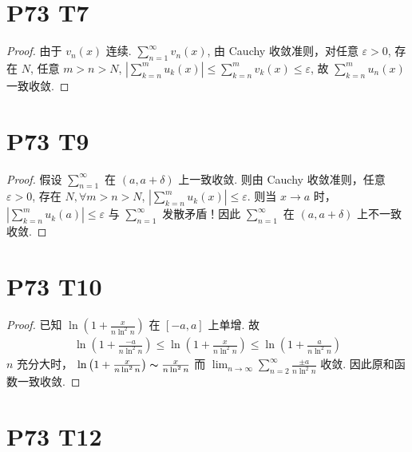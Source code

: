 \documentclass{article}
\begin{document}
\section*{P73 T7}

\begin{proof}
    由于 $v_n(x)$ 连续. $\sum_{n = 1}^{\infty}v_n(x)$, 由 Cauchy 收敛准则，对任意 $\varepsilon > 0$, 存在 $N$, 任意 $m > n > N$, $\left\lvert \sum_{k = n}^{m}u_k(x)\right\rvert \leq \sum_{k = n}^{m}v_k(x) \leq \varepsilon$, 故 $\sum_{k = n}^{m}u_n(x)$ 一致收敛.
\end{proof}

\section*{P73 T9}

\begin{proof}
    假设 $\sum_{n = 1}^{\infty}$ 在 $(a, a + \delta)$ 上一致收敛. 则由 Cauchy 收敛准则，任意 $\varepsilon > 0$, 存在 $N, \forall m > n > N$, $\left\lvert \sum_{k = n}^{m}u_k(x)\right\rvert \leq \varepsilon$. 则当 $x \to a$ 时， $\left\lvert \sum_{k = n}^{m}u_k(a)\right\rvert \leq \varepsilon$ 与 $\sum_{n = 1}^{\infty}$ 发散矛盾！因此 $\sum_{n = 1}^{\infty}$ 在 $(a, a + \delta)$ 上不一致收敛.
\end{proof}

\section*{P73 T10}

\begin{proof}
    已知 $\ln \left(1 + \frac{x}{n \ln^2 n}\right)$ 在 $[-a, a]$ 上单增. 故
    \begin{align*}
        \ln \left(1 + \frac{-a}{n \ln^2 n}\right) \leq \ln \left(1 + \frac{x}{n \ln^2 n}\right) \leq \ln \left(1 + \frac{a}{n \ln^2 n}\right)
    \end{align*}
    $n$ 充分大时， $\ln \left(1 + \frac{x}{n \ln^2 n}\right) \thicksim \frac{x}{n \ln^2 n}$
    而 $\lim_{n \to \infty}\sum_{n = 2}^{\infty}\frac{\pm a}{n \ln^2 n} $ 收敛. 因此原和函数一致收敛.
\end{proof}

\section*{P73 T12}
\end{document}
